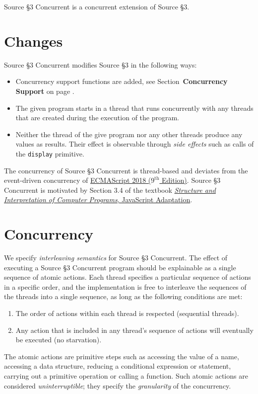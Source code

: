 





Source \S 3 Concurrent is a concurrent extension of Source \S 3.

\section*{Changes}

Source \S 3 Concurrent modifies Source \S 3 in the following ways:
\begin{itemize}
\item Concurrency support functions are added, see Section~\textbf{Concurrency Support} on page \pageref{conc_supp}.
\item The given program starts in a thread that runs concurrently with any
  threads that are created during the execution of the program.
\item Neither the thread of the give program nor any other threads produce
  any values as results. Their effect is observable through \emph{side effects}
  such as calls of the \lstinline{display} primitive.
\end{itemize}
\noindent
The concurrency of Source \S 3 Concurrent is thread-based and deviates
from the event-driven concurrency of  
\href{http://www.ecma-international.org/publications/files/ECMA-ST/Ecma-262.pdf}{\color{DarkBlue}
  ECMAScript 2018 ($9^{\textrm{th}}$ Edition)}. Source \S 3 Concurrent is
motivated by Section 3.4 of the textbook
\href{https://sicp.comp.nus.edu.sg}{\color{DarkBlue}\emph{Structure and Interpretation
of Computer Programs}, JavaScript Adaptation}.

\section*{Concurrency}

We specify \emph{interleaving semantics} for Source \S 3 Concurrent.
The effect of executing a Source \S 3 Concurrent program
should be explainable as a single sequence of atomic actions. Each thread
specifies a particular sequence of actions in a specific order,
and the implementation is free to interleave the sequences of the threads
into a single sequence, as long as the following conditions are met:
\begin{enumerate}
\item The order of actions within each thread is respected (sequential
  threads).
\item Any action that is included in any thread's sequence of actions will
  eventually be executed (no starvation).
\end{enumerate}
\noindent
The atomic actions are primitive steps such as accessing the value of a name,
accessing a data structure, reducing a conditional expression or statement,
carrying out a primitive operation or calling a function. Such atomic actions
are considered \emph{uninterruptible}; they specify the \emph{granularity}
of the concurrency.

